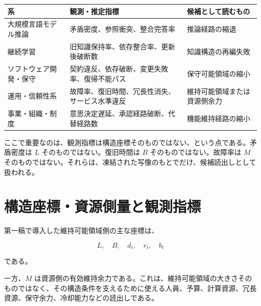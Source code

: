 \documentclass[12pt,a4paper]{article}
\begin{document}
{\def\LTcaptype{table} %
\begin{longtable}[]{@{}
  >{\raggedright\arraybackslash}p{}
  >{\raggedright\arraybackslash}p{}
  >{\raggedright\arraybackslash}p{}@{}}
\toprule\noalign{}
\begin{minipage}[b]{\linewidth}\raggedright
系
\end{minipage} & \begin{minipage}[b]{\linewidth}\raggedright
観測・推定指標
\end{minipage} & \begin{minipage}[b]{\linewidth}\raggedright
候補として読むもの
\end{minipage} \\
\midrule\noalign{}
\endhead
\bottomrule\noalign{}
\endlastfoot
大規模言語モデル推論 & 矛盾密度、参照衝突、整合完答率 & 推論経路の縮退 \\
継続学習 & 旧知識保持率、依存整合率、更新後破断数 & 知識構造の再編失敗 \\
ソフトウェア開発・保守 & 契約違反、依存破断、変更失敗率、復帰不能パス & 保守可能領域の縮小 \\
運用・信頼性系 & 故障率、復旧時間、冗長性消失、サービス水準違反 & 維持可能領域または資源側余力 \\
事業・組織・制度 & 意思決定遅延、承認経路破断、代替経路数 & 機能維持経路の縮小 \\
\end{longtable}
}

ここで重要なのは、観測指標は構造座標そのものではない、という点である。矛盾密度は \(L\) そのものではない。復旧時間は \(B\) そのものではない。故障率は \(M\) そのものではない。それらは、凍結された写像のもとでだけ、候補読出しとして扱われる。

\section{構造座標・資源側量と観測指標}\label{ux69cbux9020ux5ea7ux6a19ux8cc7ux6e90ux5074ux91cfux3068ux89b3ux6e2cux6307ux6a19}

第一稿で導入した維持可能領域側の主な座標は、

\[
L,\quad B,\quad d_{t},\quad r_{t},\quad b_{t}
\]

である。

一方、\(M\) は資源側の有効維持余力である。これは、維持可能領域の大きさそのものではなく、その構造条件を支えるために使える人員、予算、計算資源、冗長資源、保守余力、冷却能力などの読出しである。
\end{document}
